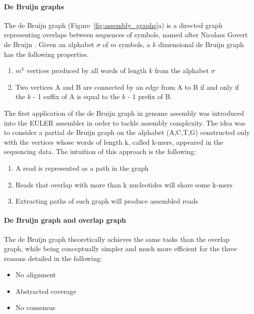 \paragraph{De Bruijn graphs}
The de Bruijn graph (Figure~\ref{fig:assembly_graphs}a) is a directed graph representing overlaps
between sequences of symbols, named after Nicolass Govert de Bruijn \citep{todd1933combinatorial}. Given an
alphabet $\sigma$ of $m$ symbols, a $k$ dimensional de Bruijn graph has the following properties.
\begin{enumerate}
 \item $m^k$ vertices produced by all words of length $k$ from the alphabet $\sigma$
 \item Two vertices A and B are connected by an edge from A to B if and only if the $k$ - 1
suffix of A is equal to the $k$ - 1 prefix of B.
\end{enumerate}

The first application of the de Bruijn graph in genome assembly was introduced into
the EULER assembler \citep{pevzner2001eulerian} in order to tackle assembly complexity. The idea was to
consider a partial de Bruijn graph on the alphabet (A,C,T,G) constructed only with the
vertices whose words of length k, called k-mers, appeared in the sequencing data. The
intuition of this approach is the following:
\begin{enumerate}
 \item A read is represented as a path in the graph
 \item Reads that overlap with more than k nucleotides will share some k-mers
 \item Extracting paths of such graph will produce assembled reads
\end{enumerate}

\paragraph{De Bruijn graph and overlap graph}
The de Bruijn graph theoretically achieves
the same tasks than the overlap graph, while being conceptually simpler and much more
efficient for the three reasons detailed in the following:
\begin{itemize}
 \item No alignment
 \item Abstracted coverage
 \item No consensus
\end{itemize}

